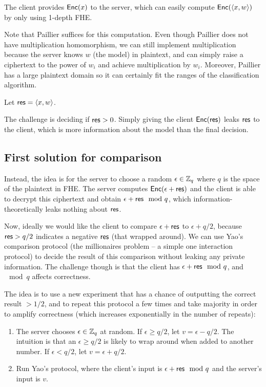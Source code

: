 \documentclass[11pt]{article}
\begin{document}
The client provides $\mathsf{Enc}(x)$ to the server, which can easily compute
$\mathsf{Enc}(\langle x, w \rangle)$ by only using 1-depth FHE. 

Note that Paillier suffices for this computation. Even though Paillier does not have multiplication homomorphism, we can still implement
multiplication because the server knows $w$ (the model) in plaintext, and can simply raise a ciphertext to the power of $w_i$ and achieve multiplication by $w_i$. Moreover, Paillier has a large plaintext domain so it can certainly fit the ranges of the classification algorithm. 

Let $\mathsf{res} = \langle x,
w \rangle$.

The challenge is deciding if $\mathsf{res} > 0$. Simply giving the client $\mathsf{Enc}(\mathsf{res})$ leaks $\mathsf{res}$ to the client, which is more information about the model than the final decision.
                            
\subsection{First solution for comparison} %
\label{sub:first_solution_for_comparison}

Instead, the idea is for the server to choose a random $\epsilon \in {\mathbb Z}_q$ where $q$ is the space of the plaintext in FHE. The server computes $\mathsf{Enc}(\epsilon + \mathsf{res})$ and the client is able to decrypt this ciphertext and obtain $\epsilon + \mathsf{res} \mod q$, which information-theoretically leaks nothing about $\mathsf{res}$.

Now, ideally we would like the client to compare $\epsilon + \mathsf{res}$ to $\epsilon + q/2$, because $\mathsf{res} > q/2$ indicates a negative $\mathsf{res}$ (that wrapped around). We can use Yao's comparison protocol (the millionaires problem -- a simple one interaction protocol) to decide the result of this comparison without leaking any private information. The challenge though is that the client has $\epsilon + \mathsf{res} \mod q$, and $\mod q$ affects correctness.

The idea is to use a new experiment that has a chance of outputting the correct result $>1/2$, and to repeat this protocol a few times and take majority in order to amplify correctness (which increases exponentially in the number of repeats):

\newcommand{\eps}{\epsilon}

\begin{enumerate}
\item
    The server chooses $\epsilon \in {\mathbb Z}_q$ at random. If $\epsilon \geq q/2$,
    let $v = \eps - q/2$. The intuition is that an $\eps \geq q/2$ is likely to
    wrap around when added to another number. If $\eps < q/2$, let $v = \eps +
    q/2$.
\item Run Yao's protocol, where the client's input is $\eps + \res \mod q$ and the server's input is $v$.
\end{enumerate}
\end{document}
